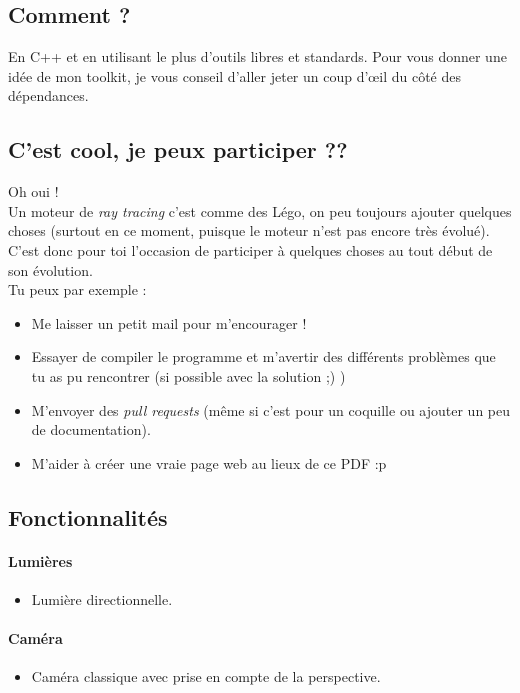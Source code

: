 \subsection{Comment ?}
En C++ et en utilisant le plus d'outils libres et standards. Pour vous donner
une idée de mon toolkit, je vous conseil d'aller jeter un coup d'œil du côté
des dépendances.

\subsection{C'est cool, je peux participer ??}
Oh oui !\\

Un moteur de \textsl{ray tracing} c'est comme des Légo, on peu toujours
ajouter quelques choses (surtout en ce moment, puisque le moteur n'est pas
encore très évolué). C'est donc pour toi l'occasion de participer à quelques
choses au tout début de son évolution.\\

Tu peux par exemple :
\begin{itemize}
  \item Me laisser un petit mail pour m'encourager !
  \item Essayer de compiler le programme et m'avertir des différents problèmes
    que tu as pu rencontrer (si possible avec la solution ;) )
  \item M'envoyer des \textsl{pull requests} (même si c'est pour un coquille
    ou ajouter un peu de documentation).
  \item M'aider à créer une vraie page web au lieux de ce PDF :p
\end{itemize}

\subsection{Fonctionnalités}
\paragraph{Lumières}
\begin{itemize}
  \item Lumière directionnelle.
\end{itemize}

\paragraph{Caméra}
\begin{itemize}
  \item Caméra classique avec prise en compte de la perspective.
\end{itemize}


